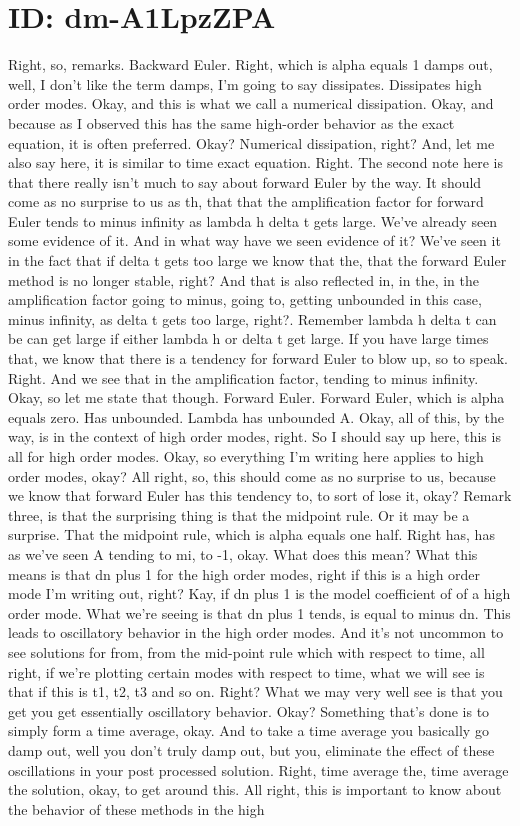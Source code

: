 \documentclass[10pt]{article}
\begin{document}
\section*{ID: dm-A1LpzZPA}
Right, so, remarks. Backward Euler. Right, which is alpha equals 1 damps out, well, I don't like the term damps, I'm going to say dissipates. Dissipates high order modes. Okay, and this is what we call a numerical dissipation. Okay, and because as I observed this has the same high-order behavior as the exact equation, it is often preferred. Okay? Numerical dissipation, right? And, let me also say here, it is similar to time exact equation. Right. The second note here is that there really isn't much to say about forward Euler by the way. It should come as no surprise to us as th, that that the amplification factor for forward Euler tends to minus infinity as lambda h delta t gets large. We've already seen some evidence of it. And in what way have we seen evidence of it? We've seen it in the fact that if delta t gets too large we know that the, that the forward Euler method is no longer stable, right? And that is also reflected in, in the, in the amplification factor going to minus, going to, getting unbounded in this case, minus infinity, as delta t gets too large, right?. Remember lambda h delta t can be can get large if either lambda h or delta t get large. If you have large times that, we know that there is a tendency for forward Euler to blow up, so to speak. Right. And we see that in the amplification factor, tending to minus infinity. Okay, so let me state that though. Forward Euler. Forward Euler, which is alpha equals zero. Has unbounded. Lambda has unbounded A. Okay, all of this, by the way, is in the context of high order modes, right. So I should say up here, this is all for high order modes. Okay, so everything I'm writing here applies to high order modes, okay? All right, so, this should come as no surprise to us, because we know that forward Euler has this tendency to, to sort of lose it, okay? Remark three, is that the surprising thing is that the midpoint rule. Or it may be a surprise. That the midpoint rule, which is alpha equals one half. Right has, has as we've seen A tending to mi, to -1, okay. What does this mean? What this means is that dn plus 1 for the high order modes, right if this is a high order mode I'm writing out, right? Kay, if dn plus 1 is the model coefficient of of a high order mode. What we're seeing is that dn plus 1 tends, is equal to minus dn. This leads to oscillatory behavior in the high order modes. And it's not uncommon to see solutions for from, from the mid-point rule which with respect to time, all right, if we're plotting certain modes with respect to time, what we will see is that if this is t1, t2, t3 and so on. Right? What we may very well see is that you get you get essentially oscillatory behavior. Okay? Something that's done is to simply form a time average, okay. And to take a time average you basically go damp out, well you don't truly damp out, but you, eliminate the effect of these oscillations in your post processed solution. Right, time average the, time average the solution, okay, to get around this. All right, this is important to know about the behavior of these methods in the high 
\end{document}
